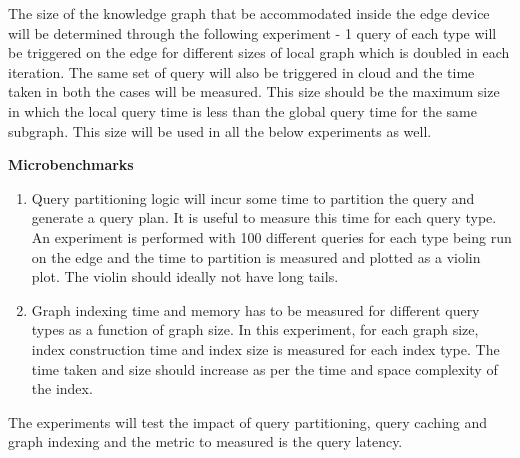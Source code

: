 \documentclass[conference]{IEEEtran}
\begin{document}
The size of the knowledge graph that be accommodated inside the edge device will be determined through the following experiment - 1 query of each type will be triggered on the edge for different sizes of local graph which is doubled in each iteration. The same set of query will also be triggered in cloud and the time taken in both the cases will be measured. This size should be the maximum size in which the local query time is less than the global query time for the same subgraph. This size will be used in all the below experiments as well.

\textbf{Microbenchmarks}
\begin{enumerate}%
	\item Query partitioning logic will incur some time to partition the query and generate a query plan. It is useful to measure this time for each query type. An experiment is performed with 100 different queries for each type being run on the edge and the time to partition is measured and plotted as a violin plot. The violin should ideally not have long tails.
	\item Graph indexing time and memory has to be measured for different query types as a function of graph size. In this experiment, for each graph size, index construction time and index size is measured for each index type. The time taken and size should increase as per the time and space complexity of the index.
\end{enumerate}

The experiments will test the impact of query partitioning, query caching and graph indexing and the metric to measured is the query latency.  
\end{document}
